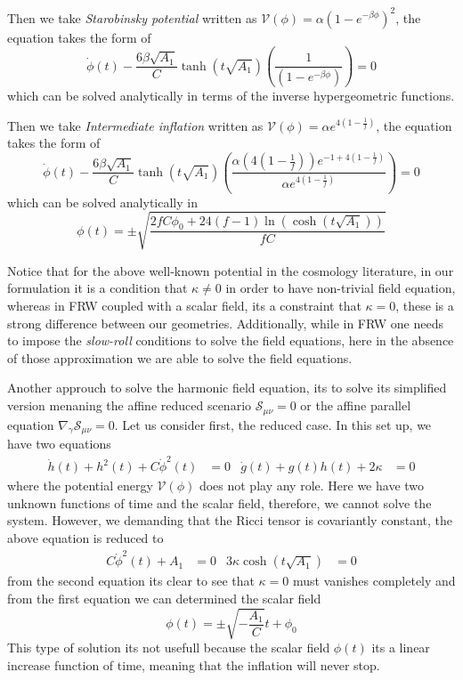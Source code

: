 \documentclass[10pt,a4paper]{article}
\begin{document}
Then we take \textit{Starobinsky potential} written as $\mathcal{V}(\phi) =  \alpha \left(1 - e^{-\beta\phi}\right)^2$, the equation takes
the form of
\begin{equation}
  \dot{\phi}(t) - \frac{6\beta\sqrt{A_1}}{C}\tanh\left(t\sqrt{A_1}\right)\left(\frac{1}{\left(1 - e^{-\beta\phi}\right)}\right) = 0
\end{equation}
which can be solved analytically in terms of the inverse hypergeometric functions.

Then we take \textit{Intermediate inflation} written as $\mathcal{V}(\phi) =  \alpha e^{4\left(1-\frac{1}{f}\right)}$, the equation takes
the form of
\begin{equation}
  \dot{\phi}(t) - \frac{6\beta\sqrt{A_1}}{C}\tanh\left(t\sqrt{A_1}\right)\left(\frac{\alpha \left(4\left(1 - \frac{1}{f}\right)\right) e^{-1 + 4\left(1-\frac{1}{f}\right)}}{\alpha e^{4\left(1-\frac{1}{f}\right)}}\right) = 0
\end{equation}
which can be solved analytically in 
\begin{equation}
  \phi(t) = \pm \sqrt{\frac{2fC\phi_0 + 24(f-1)\ln(\cosh(t\sqrt{A_1}))}{fC}}
\end{equation}

Notice that for the above well-known potential in the cosmology literature, in our formulation it is a condition that $\kappa \neq 0$ in order
to have non-trivial field equation, whereas in FRW coupled with a scalar field, its a constraint that $\kappa = 0$, these is a strong difference
between our geometries. Additionally, while in FRW one needs to impose the \textit{slow-roll} conditions to solve the field equations, here
in the absence of those approximation we are able to solve the field equations.

Another approuch to solve the harmonic field equation, its to solve its simplified version menaning the affine reduced scenario $\mathcal{S}_{\mu\nu} = 0$
or the affine parallel equation $\nabla_\gamma\mathcal{S}_{\mu\nu} = 0$. Let us consider first, the reduced case. In this set up, we have two equations
\begin{align}
  \dot{h}(t) + h^2(t) + C\dot{\phi}^2(t) & = 0 & \dot{g}(t) + g(t)h(t) + 2\kappa & = 0
\end{align}
where the potential energy $\mathcal{V}(\phi)$ does not play any role. Here we have two unknown functions of time and the scalar field, therefore, we 
cannot solve the system. However, we demanding that the Ricci tensor is covariantly constant, the above equation is reduced to
\begin{align}
  C\dot{\phi}^2(t) + A_1 & = 0 & 3\kappa \cosh(t\sqrt{A_1}) & = 0
\end{align}
from the second equation its clear to see that $\kappa = 0$ must vanishes completely and from the first equation we can determined
the scalar field
\begin{equation}
  \phi(t) = \pm\sqrt{-\frac{A_1}{C}}t + \phi_0
\end{equation}
This type of solution its not usefull because the scalar field $\phi(t)$ its a linear increase function of time, meaning that the inflation
will never stop. 
\end{document}
